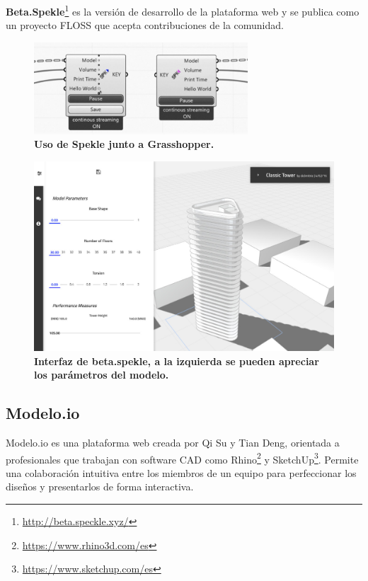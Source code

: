 \textbf{Beta.Spekle}\footnote{\url{http://beta.speckle.xyz/}} es la versión de desarrollo de la plataforma web y se publica como un proyecto FLOSS que acepta contribuciones de la comunidad.

\begin{figure}[h]
\includegraphics[width=8cm]{Img/WEB/web-plugin.jpg}
\centering
\caption{\textbf{ \footnotesize{Uso de Spekle junto a Grasshopper.}}}
\label{fig:plugin}
\end{figure}

\begin{figure}[h]
\includegraphics[width=14cm]{Img/WEB/web-spekle.jpg}
\centering
\caption{\textbf{ \footnotesize{Interfaz de beta.spekle, a la izquierda se pueden apreciar los parámetros del modelo.}}}
\label{fig:spekle}
\end{figure}


\subsection{Modelo.io}

Modelo.io\citep{Modelo.io2018} es una plataforma web creada por Qi Su y Tian Deng, orientada a profesionales que trabajan con software CAD como Rhino\footnote{\url{https://www.rhino3d.com/es}} y SketchUp\footnote{\url{https://www.sketchup.com/es}}. Permite una colaboración intuitiva entre los miembros de un equipo para perfeccionar los diseños y presentarlos de forma interactiva.

